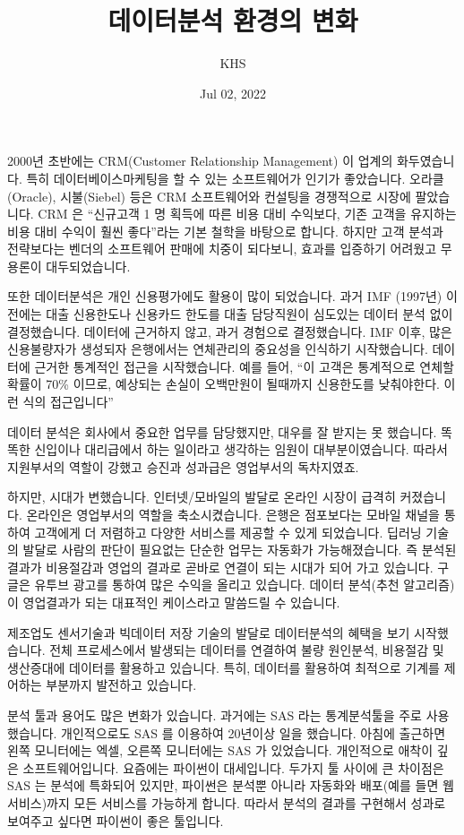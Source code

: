 \documentclass[letterpaper,10pt,english]{jupyterBook}
\title{데이터분석 환경의 변화}
\date{Jul 02, 2022}
\author{KHS}
\begin{document}
\pagestyle{empty}
\sphinxmaketitle
\pagestyle{plain}
\sphinxtableofcontents
\pagestyle{normal}
\label{\detokenize{chapter1/1.2.0_Data_Science::doc}}




\sphinxAtStartPar
2000년 초반에는 CRM(Customer Relationship Management) 이  업계의 화두였습니다. 특히 데이터베이스마케팅을 할 수 있는 소프트웨어가 인기가 좋았습니다. 오라클(Oracle), 시불(Siebel) 등은 CRM 소프트웨어와 컨설팅을 경쟁적으로 시장에 팔았습니다. CRM 은 “신규고객 1 명 획득에 따른 비용 대비 수익보다, 기존 고객을 유지하는 비용 대비 수익이 훨씬 좋다”라는 기본 철학을 바탕으로 합니다. 하지만 고객 분석과 전략보다는 벤더의 소프트웨어 판매에 치중이 되다보니, 효과를 입증하기 어려웠고 무용론이 대두되었습니다.

\sphinxAtStartPar
또한 데이터분석은 개인 신용평가에도 활용이 많이 되었습니다. 과거 IMF (1997년) 이전에는 대출 신용한도나 신용카드 한도를 대출 담당직원이 심도있는 데이터 분석 없이 결정했습니다. 데이터에 근거하지 않고, 과거 경험으로 결정했습니다. IMF 이후, 많은 신용불량자가 생성되자 은행에서는 연체관리의 중요성을 인식하기 시작했습니다. 데이터에 근거한 통계적인 접근을 시작했습니다. 예를 들어, “이 고객은 통계적으로 연체할 확률이 70\% 이므로, 예상되는 손실이 오백만원이 될때까지 신용한도를 낮춰야한다. 이런 식의 접근입니다”

\sphinxAtStartPar
데이터 분석은 회사에서 중요한 업무를 담당했지만, 대우를 잘 받지는 못 했습니다. 똑똑한 신입이나 대리급에서 하는 일이라고 생각하는 임원이 대부분이였습니다. 따라서 지원부서의 역할이 강했고 승진과 성과급은 영업부서의 독차지였죠.

\sphinxAtStartPar
하지만, 시대가 변했습니다. 인터넷/모바일의 발달로 온라인 시장이 급격히 커졌습니다. 온라인은 영업부서의 역할을 축소시켰습니다. 은행은 점포보다는 모바일 채널을 통하여 고객에게 더 저렴하고 다양한 서비스를 제공할 수 있게 되었습니다.  딥러닝 기술의 발달로 사람의 판단이 필요없는 단순한 업무는 자동화가 가능해졌습니다. 즉 분석된 결과가 비용절감과 영업의 결과로 곧바로 연결이 되는 시대가 되어 가고 있습니다. 구글은 유투브 광고를 통하여 많은 수익을 올리고 있습니다. 데이터 분석(추천 알고리즘) 이 영업결과가 되는 대표적인 케이스라고 말씀드릴 수 있습니다.

\sphinxAtStartPar
제조업도 센서기술과 빅데이터 저장 기술의 발달로 데이터분석의 혜택을 보기 시작했습니다. 전체 프로세스에서 발생되는 데이터를 연결하여 불량 원인분석, 비용절감 및 생산증대에 데이터를 활용하고 있습니다. 특히, 데이터를 활용하여 최적으로 기계를 제어하는 부분까지 발전하고 있습니다.

\sphinxAtStartPar
분석 툴과 용어도 많은 변화가 있습니다. 과거에는 SAS 라는 통계분석툴을 주로 사용했습니다. 개인적으로도 SAS 를 이용하여 20년이상 일을 했습니다. 아침에 출근하면 왼쪽 모니터에는 엑셀, 오른쪽 모니터에는 SAS 가 있었습니다. 개인적으로 애착이 깊은 소프트웨어입니다. 요즘에는 파이썬이 대세입니다. 두가지 툴 사이에 큰 차이점은 SAS 는 분석에 특화되어 있지만, 파이썬은 분석뿐 아니라 자동화와 배포(예를 들면 웹서비스)까지 모든 서비스를 가능하게 합니다. 따라서 분석의 결과를 구현해서 성과로 보여주고 싶다면 파이썬이 좋은 툴입니다.
\end{document}

